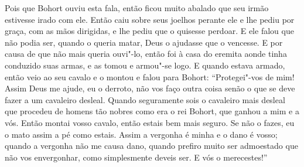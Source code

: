 Pois que Bohort ouviu esta fala, então ficou muito abalado que seu irmão
estivesse irado com ele. Então caiu sobre seus joelhos perante ele e lhe pediu
por graça, com as mãos dirigidas, e lhe pediu que o quisesse perdoar. E ele
falou que não podia ser, quando o queria matar, Deus o ajudasse que o vencesse.
E por causa de que não mais queria ouvi"-lo, então foi à casa do eremita aonde
tinha conduzido suas armas, e as tomou e armou"-se logo. E quando estava armado,
então veio ao seu cavalo e o montou e falou para Bohort: “Protegei"-vos de mim!
Assim Deus me ajude, eu o derroto, não vos faço outra coisa senão o que se deve
fazer a um cavaleiro desleal. Quando seguramente sois o cavaleiro mais desleal
que procedeu de homens tão nobres como era o rei Bohort, que ganhou a mim e a
vós. Então montai vosso cavalo, então estais bem mais seguro. Se não o
fazes, eu o mato assim a pé como estais. Assim a vergonha é minha e o dano é
vosso; quando a vergonha não me causa dano, quando prefiro muito ser admoestado
que não vos envergonhar, como simplesmente deveis ser. E vós o merecestes!” 

